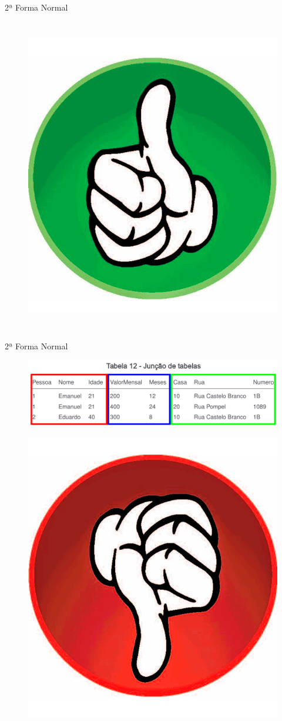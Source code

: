\documentclass{beamer} %
\begin{document}
\begin{frame}{2ª Forma Normal}
\begin{columns}
    \begin{figure}
        \centering
        \includegraphics[width=\linewidth]{imagens/certo.png}
        \label{fig:2f-certo}
    \end{figure}
\end{columns}
\end{frame}

\begin{frame}{2ª Forma Normal}
    \begin{figure}
        \centering
        \includegraphics[width=\linewidth]{imagens/2-forma-normal-errado.png}
        \label{fig:2-forma-normal-errado}
    \end{figure}
    \begin{figure}
        \centering
        \includegraphics[width=0.2\linewidth]{imagens/errado.png}
        \label{fig:2f-errado}
    \end{figure}
\end{frame}
\end{document}
